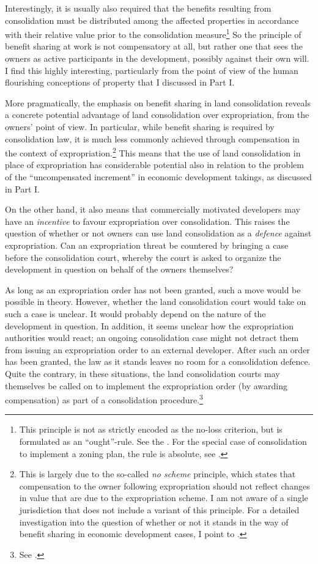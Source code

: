 Interestingly, it is usually also required that the benefits resulting from consolidation must be distributed  among the affected properties in accordance with their relative value prior to the consolidation measure\footnote{This principle is not as strictly encoded as the no-loss criterion, but is formulated as an ``ought''-rule. See the \cite[31|41]{lca79}. For the special case of consolidation to implement a zoning plan, the rule is absolute, see \cite[3 b)]{lca79}.} So the principle of benefit sharing at work is not compensatory at all, but rather one that sees the owners as active participants in the development, possibly against their own will. I find this highly interesting, particularly from the point of view of the human flourishing conceptions of property that I discussed in Part I.

More pragmatically, the emphasis on benefit sharing in land consolidation reveals a concrete potential advantage of land consolidation over expropriation, from the owners' point of view. In particular, while benefit sharing is required by consolidation law, it is much less commonly achieved through compensation in the context of expropriation.\footnote{This is largely due to the so-called {\it no scheme} principle, which states that compensation to the owner following expropriation should not reflect changes in value that are due to the expropriation scheme. I am not aware of a single jurisdiction that does not include a variant of this principle. For a detailed investigation into the question of whether or not it stands in the way of benefit sharing in economic development cases, I point to \cite{dyrkolbotn15}.} This means that the use of land consolidation in place of expropriation has considerable potential also in relation to the problem of the ``uncompensated increment'' in economic development takings, as discussed in Part I.

On the other hand, it also means that commercially motivated developers may have an {\it incentive} to favour expropriation over consolidation. This raises the question of whether or not owners can use land consolidation as a {\it defence} against expropriation. Can an expropriation threat be countered by bringing a case before the consolidation court, whereby the court is asked to organize the development in question on behalf of the owners themselves?

As long as an expropriation order has not been granted, such a move would be possible in theory. However, whether the land consolidation court would take on such a case is unclear. It would probably depend on the nature of the development in question. In addition, it seems unclear how the expropriation authorities would react; an ongoing consolidation case might not detract them from issuing an expropriation order to an external developer. After such an order has been granted, the law as it stands leaves no room for a consolidation defence. Quite the contrary, in these situations, the land consolidation courts may themselves be called on to implement the expropriation order (by awarding compensation) as part of a consolidation procedure.\footnote{See \cite[6]{lca79}.}

